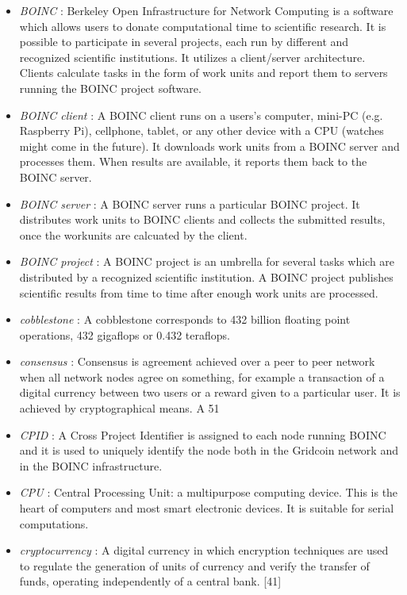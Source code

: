 \begin{itemize}
  \item \textit{BOINC} : Berkeley Open Infrastructure for Network Computing is a software which allows users to donate computational time to scientific research. It is possible to participate in several projects, each run by different and recognized scientific institutions. It utilizes a client/server architecture. Clients calculate tasks in the form of work units and report them to servers running the BOINC project software.
  \item \textit{BOINC client} : A BOINC client runs on a users's computer, mini-PC (e.g. Raspberry Pi), cellphone, tablet, or any other device with a CPU (watches might come in the future). It downloads work units from a BOINC server and processes them. When results are available, it reports them back to the BOINC server.
  \item \textit{BOINC server} : A BOINC server runs a particular BOINC project. It distributes work units to BOINC clients and collects the submitted results, once the workunits are calcuated by the client.
  \item \textit{BOINC project} : A BOINC project is an umbrella for several tasks which are distributed by a recognized scientific institution. A BOINC project publishes scientific results from time to time after enough work units are processed.
  \item \textit{cobblestone} : A cobblestone corresponds to 432 billion floating point operations, 432 gigaflops or 0.432 teraflops.
  \item \textit{consensus} : Consensus is agreement achieved over a peer to peer network when all network nodes agree on something, for example a transaction of a digital currency between two users or a reward given to a particular user. It is achieved by cryptographical means. A 51%
  \item \textit{CPID} : A Cross Project Identifier is assigned to each node running BOINC and it is used to uniquely identify the node both in the Gridcoin network and in the BOINC infrastructure.
  \item \textit{CPU} : Central Processing Unit: a multipurpose computing device. This is the heart of computers and most smart electronic devices. It is suitable for serial computations. 
  \item \textit{cryptocurrency} : A digital currency in which encryption techniques are used to regulate the generation of units of currency and verify the transfer of funds, operating independently of a central bank. [41]

\end{itemize}
